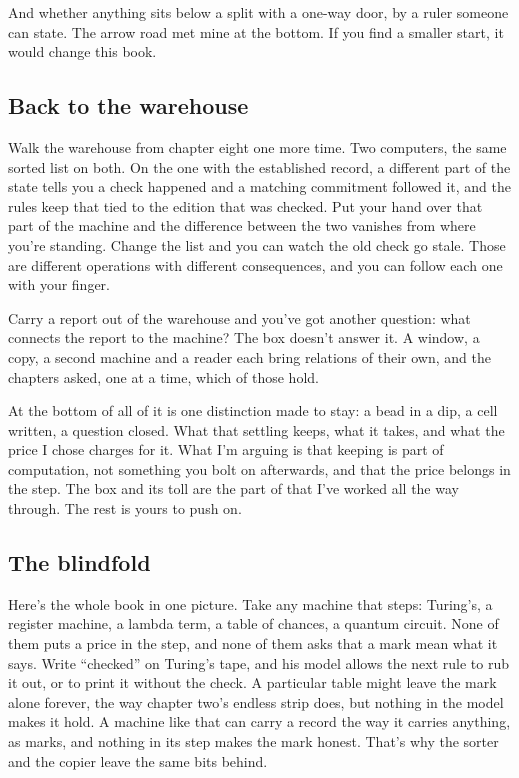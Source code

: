 \documentclass[11pt,twoside]{article}
\theoremstyle{thielethm}
\theoremstyle{thieledef}
\theoremstyle{thieledef}
\theoremstyle{thieledef}
\theoremstyle{thielethm}
\theoremstyle{thieleobs}
\theoremstyle{thielethm}
\begin{document}
And whether anything sits below a split with a one-way door, by a ruler someone can state. The arrow road met mine at the bottom. If you find a smaller start, it would change this book.

\subsection{Back to the warehouse}

Walk the warehouse from chapter eight one more time. Two computers, the same sorted list on both. On the one with the established record, a different part of the state tells you a check happened and a matching commitment followed it, and the rules keep that tied to the edition that was checked. Put your hand over that part of the machine and the difference between the two vanishes from where you're standing. Change the list and you can watch the old check go stale. Those are different operations with different consequences, and you can follow each one with your finger.

Carry a report out of the warehouse and you've got another question: what connects the report to the machine? The box doesn't answer it. A window, a copy, a second machine and a reader each bring relations of their own, and the chapters asked, one at a time, which of those hold.

At the bottom of all of it is one distinction made to stay: a bead in a dip, a cell written, a question closed. What that settling keeps, what it takes, and what the price I chose charges for it. What I'm arguing is that keeping is part of computation, not something you bolt on afterwards, and that the price belongs in the step. The box and its toll are the part of that I've worked all the way through. The rest is yours to push on.

\subsection{The blindfold}

Here's the whole book in one picture. Take any machine that steps: Turing's, a register machine, a lambda term, a table of chances, a quantum circuit. None of them puts a price in the step, and none of them asks that a mark mean what it says. Write ``checked'' on Turing's tape, and his model allows the next rule to rub it out, or to print it without the check. A particular table might leave the mark alone forever, the way chapter two's endless strip does, but nothing in the model makes it hold. A machine like that can carry a record the way it carries anything, as marks, and nothing in its step makes the mark honest. That's why the sorter and the copier leave the same bits behind.
\end{document}
